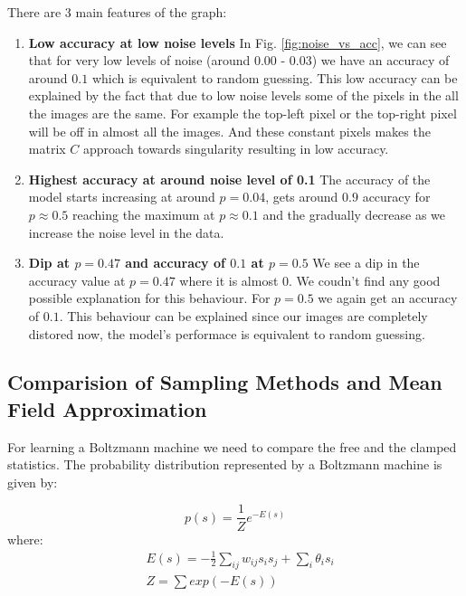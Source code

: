 \documentclass{article}
\begin{document}
There are 3 main features of the graph:
\begin{enumerate}

  \item \textbf {Low accuracy at low noise levels} \break
    In Fig. \ref{fig:noise_vs_acc}, we can see that for very low levels of noise 
    (around 0.00 - 0.03) we have an accuracy of around $ 0.1 $ which is 
    equivalent to random guessing. This low accuracy can be explained by the 
    fact that due to low noise levels some of the pixels in the all the images
    are the same. For example the top-left pixel or the top-right pixel will
    be off in almost all the images. And these constant pixels makes the matrix
    $ C $ approach towards singularity resulting in low accuracy.

  \item \textbf{Highest accuracy at around noise level of 0.1} \break
    The accuracy of the model starts increasing at around $ p=0.04 $, gets 
    around $ 0.9 $ accuracy for $ p \approx 0.5 $ reaching the maximum at 
    $ p \approx 0.1 $ and the gradually decrease as we increase the noise
    level in the data.

  \item \textbf{Dip at $ p=0.47 $ and accuracy of $ 0.1 $ at $ p=0.5 $} \break
    We see a dip in the accuracy value at $ p=0.47 $ where it is almost $ 0 $.
    We coudn't find any good possible explanation for this behaviour. For 
    $ p = 0.5 $ we again get an accuracy of $ 0.1 $. This behaviour can be 
    explained since our images are completely distored now, the model's 
    performace is equivalent to random guessing.

\end{enumerate}

\subsection{Comparision of Sampling Methods and Mean Field Approximation}
For learning a Boltzmann machine we need to compare the free and the clamped
statistics. The probability distribution represented by a Boltzmann machine
is given by:

$$ p(s) = \frac{1}{Z} e^{-E(s)} $$
where: 
\begin{equation}
  \begin{split}
    & E(s) = - \frac{1}{2} \sum_{ij} w_{ij} s_i s_j  + \sum_i \theta_i s_i \\
    & Z = \sum exp(-E(s)) 
  \end{split}
\end{equation}
\end{document}
